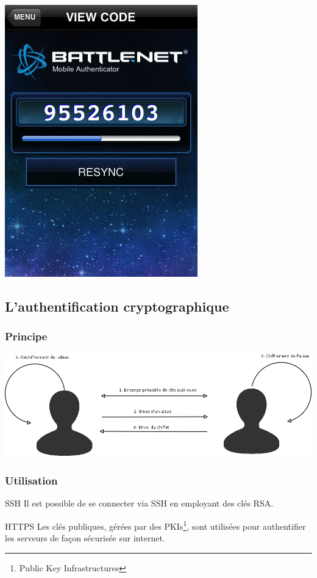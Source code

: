 \documentclass[xcolor=table]{beamer}
\begin{document}
\begin{frame}
\begin{center}
\includegraphics[scale=0.405]{../graphics/blizzardauth.jpg}
\end{center}


\end{frame}

\subsection{L'authentification cryptographique}
\begin{frame}
\frametitle{Principe}
\includegraphics[scale=0.24]{../graphics/authcrypt.png}
\end{frame}

\begin{frame}
\frametitle{Utilisation}
\begin{block}{SSH}
Il est possible de se connecter via SSH en employant des clés RSA.
\end{block}

\begin{block}{HTTPS}
Les clés publiques, gérées par des PKIs\footnote{Public Key Infrastructures}, sont utilisées pour authentifier les serveurs de façon sécurisée sur internet.
\end{block}
\end{frame}
\end{document}

